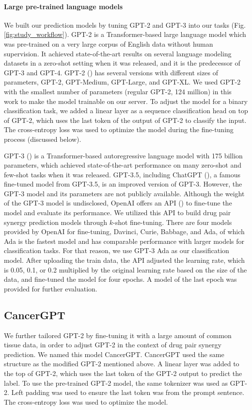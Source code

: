 {\paragraph{Large pre-trained language models}

We built our prediction models by tuning GPT-2 and GPT-3 into our tasks (Fig. \ref{fig:study_workflow}).  GPT-2 is a Transformer-based large language model which was pre-trained on a very large corpus of English data without human supervision. It achieved state-of-the-art results on several language modeling datasets in a zero-shot setting when it was released, and it is the predecessor of GPT-3 and GPT-4. GPT-2 (\cite{radford_language_nodate}) has several versions with different sizes of parameters, GPT-2, GPT-Medium, GPT-Large, and GPT-XL. We used GPT-2 with the smallest number of parameters (regular GPT-2, 124 million) in this work to make the model trainable on our server. To adjust the model for a binary classification task, we added a linear layer as a sequence classification head on top of GPT-2, which uses the last token of the output of GPT-2 to classify the input. The cross-entropy loss was used to optimize the model during the fine-tuning process (discussed below). 

 GPT-3 (\cite{brown_language_2020}) is a Transformer-based autoregressive language model with 175 billion parameters, which achieved state-of-the-art performance on many zero-shot and few-shot tasks when it was released. GPT-3.5, including ChatGPT (\cite{openai_chatgpt}), a famous fine-tuned model from GPT-3.5, is an improved version of GPT-3. However, the GPT-3 model and its parameters are not publicly available.  Although the weight of the GPT-3 model is undisclosed, OpenAI offers an API (\cite{openai_finetuning}) to fine-tune the model and evaluate its performance. We utilized this API to build drug pair synergy prediction models through $k$-shot fine-tuning. There are four models provided by OpenAI for fine-tuning, Davinci, Curie, Babbage, and Ada, of which Ada is the fastest model and has comparable performance with larger models for classification tasks. For that reason, we use GPT-3 Ada as our classification model. After uploading the train data, the API adjusted the learning rate, which is 0.05, 0.1, or 0.2 multiplied by the original learning rate based on the size of the data, and fine-tuned the model for four epochs. A model of the last epoch was provided for further evaluation. 


 \subsection{CancerGPT}
 \label{sec:cancergpt2}
 We further tailored GPT-2 by fine-tuning it with a large amount of common tissue data, in order to adjust GPT-2 in the context of drug pair synergy prediction. We named this model CancerGPT. CancerGPT used the same structure as the modified GPT-2 mentioned above. A linear layer was added to the top of GPT-2, which uses the last token of the GPT-2 output to predict the label. To use the pre-trained GPT-2 model, the same tokenizer was used as GPT-2. Left padding was used to ensure the last token was from the prompt sentence. The cross-entropy loss was used to optimize the model.  

}
